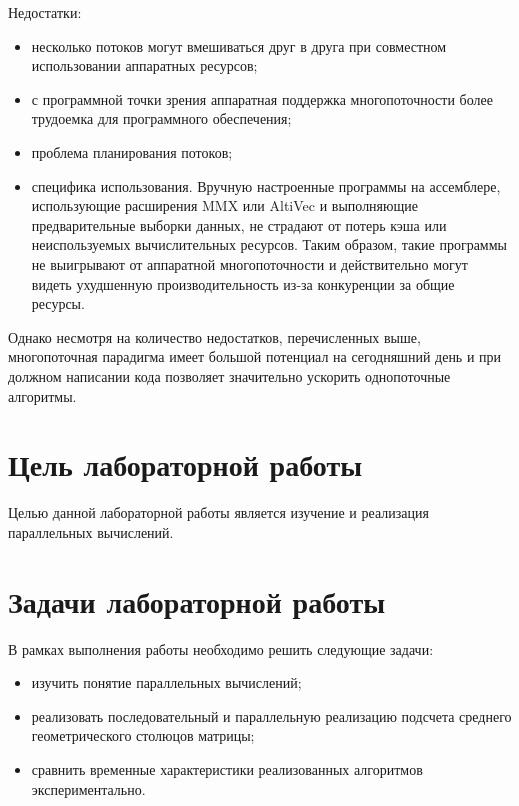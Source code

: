     
    Недостатки:
    
    \begin{itemize}
    
    	\item несколько потоков могут вмешиваться друг в друга при совместном использовании аппаратных ресурсов;
    
    	\item с программной точки зрения аппаратная поддержка многопоточности более трудоемка для программного обеспечения;
    
    	\item проблема планирования потоков;
    
    	\item специфика использования. Вручную настроенные программы на ассемблере, использующие расширения MMX или AltiVec и выполняющие предварительные выборки данных, не страдают от потерь кэша или неиспользуемых вычислительных ресурсов. Таким образом, такие программы не выигрывают от аппаратной многопоточности и действительно могут видеть ухудшенную производительность из-за конкуренции за общие ресурсы.
    
    \end{itemize}
    
    Однако несмотря на количество недостатков, перечисленных выше, многопоточная парадигма имеет большой потенциал на сегодняшний день и при должном написании кода позволяет значительно ускорить однопоточные алгоритмы.
    
    \section*{Цель лабораторной работы}
    Целью данной лабораторной работы является изучение и реализация параллельных вычислений.
    
    \section*{Задачи лабораторной работы}
    \indent В рамках выполнения работы необходимо решить следующие задачи:
    
    \begin{itemize}
    
    	\item изучить понятие параллельных вычислений;
    
    	\item реализовать последовательный и параллельную реализацию подсчета среднего геометрического столюцов матрицы;
    
    	\item сравнить временные характеристики реализованных алгоритмов экспериментально.
    \end{itemize}

\newpage